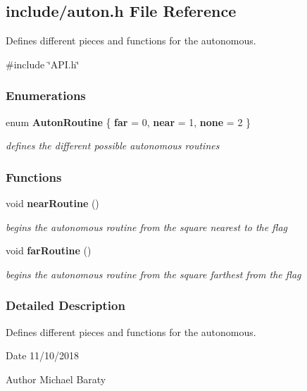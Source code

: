 \subsection{include/auton.h File Reference}
\label{auton_8h}


Defines different pieces and functions for the autonomous.  


{\ttfamily \#include \char`\"{}A\+P\+I.\+h\char`\"{}}\newline
\subsubsection*{Enumerations}
\begin{DoxyCompactItemize}
\item 
enum \textbf{ Auton\+Routine} \{ {\bfseries far} = 0, 
{\bfseries near} = 1, 
{\bfseries none} = 2
 \}
\begin{DoxyCompactList}\small\item\em defines the different possible autonomous routines \end{DoxyCompactList}\end{DoxyCompactItemize}
\subsubsection*{Functions}
\begin{DoxyCompactItemize}
\item 
void \textbf{ near\+Routine} ()
\begin{DoxyCompactList}\small\item\em begins the autonomous routine from the square nearest to the flag \end{DoxyCompactList}\item 
void \textbf{ far\+Routine} ()
\begin{DoxyCompactList}\small\item\em begins the autonomous routine from the square farthest from the flag \end{DoxyCompactList}\end{DoxyCompactItemize}


\subsubsection{Detailed Description}
Defines different pieces and functions for the autonomous. 

\begin{DoxyDate}{Date}
11/10/2018 
\end{DoxyDate}
\begin{DoxyAuthor}{Author}
Michael Baraty 
\end{DoxyAuthor}


